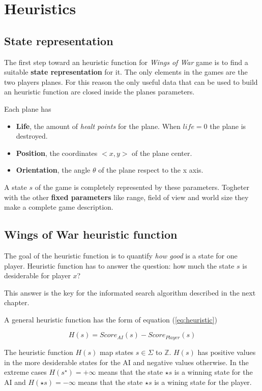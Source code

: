 
\chapter{Heuristics}

\section{State representation}

The first step toward an heuristic function for \emph{Wings of War} game is to find a 
suitable \textbf{state representation} for it. The only elements in the games are the two
players planes. For this reason the only useful data that can be used to build an heuristic
function are closed inside the planes parameters.

Each plane has

\begin{itemize}
  \item \textbf{Life}, the amount of \emph{healt points} for the plane. When $life=0$ the
    plane is destroyed.
  \item \textbf{Position}, the coordinates $<x,y>$ of the plane center.
  \item \textbf{Orientation}, the angle $\theta$ of the plane respect to the x axis.
\end{itemize}

A state $s$ of the game is completely represented by these parameters. Togheter with the
other \textbf{fixed parameters} like range, field of view and world size they make a
complete game description.

\section{Wings of War heuristic function}

The goal of the heuristic function is to quantify \emph{how good} is a state for one
player. Heuristic function has to answer the question: how much the state $s$ is
desiderable for player $x$?

This answer is the key for the informated search algorithm described in the next chapter.

A general heuristic function has the form of equation (\ref{eq:heuristic})

\begin{equation}
  H(s) = Score_{AI}(s) - Score_{Player}(s)
  \label{eq:heuristic}
\end{equation}

The heuristic function $H(s)$ map states $s \in \Sigma$ to $\mathbb{Z}$. $H(s)$ has
positive values in the more desiderable states for the AI and negative values otherwise.
In the extreme cases $H(s^\star)=+\infty$ means that the state $\star{s}$ is a winning state
for the AI and $H(\star{s})=-\infty$ means that the state $\star{s}$ is a wining state for
the player.

